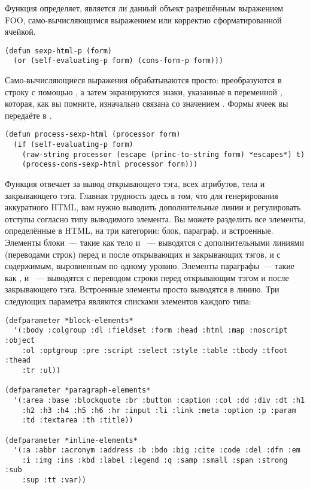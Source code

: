 Функция  определяет, является ли данный объект разрешённым выражением
FOO, само-вычисляющимся выражением или корректно сформатированной ячейкой.

\begin{lstlisting}
(defun sexp-html-p (form)
  (or (self-evaluating-p form) (cons-form-p form)))
\end{lstlisting}

Само-вычисляющиеся выражения обрабатываются просто: преобразуются в строку с помощью
, а затем экранируются знаки, указанные в переменной
, которая, как вы помните, изначально связана со значением
. Формы ячеек вы передаёте в .

\begin{lstlisting}
(defun process-sexp-html (processor form)
  (if (self-evaluating-p form)
    (raw-string processor (escape (princ-to-string form) *escapes*) t)
    (process-cons-sexp-html processor form)))
\end{lstlisting}

Функция  отвечает за вывод открывающего тэга, всех атрибутов,
тела и закрывающего тэга. Главная трудность здесь в том, что для генерирования аккуратного
HTML, вам нужно выводить дополнительные линии и регулировать отступы согласно типу
выводимого элемента. Вы можете разделить все элементы, определённые в HTML, на три
категории: блок, параграф, и встроенные. Элементы блоки~--- такие как тело и ~---
выводятся с дополнительными линиями (переводами строк) перед и после открывающих и
закрывающих тэгов, и с содержимым, выровненным по одному уровню. Элементы параграфы~---
такие как ,  и ~--- выводятся с переводом строки перед
открывающим тэгом и после закрывающего тэга. Встроенные элементы просто выводятся в
линию. Три следующих параметра являются списками элементов каждого типа:

\begin{lstlisting}
(defparameter *block-elements*
  '(:body :colgroup :dl :fieldset :form :head :html :map :noscript :object
    :ol :optgroup :pre :script :select :style :table :tbody :tfoot :thead
    :tr :ul))

(defparameter *paragraph-elements*
  '(:area :base :blockquote :br :button :caption :col :dd :div :dt :h1
    :h2 :h3 :h4 :h5 :h6 :hr :input :li :link :meta :option :p :param
    :td :textarea :th :title))

(defparameter *inline-elements*
  '(:a :abbr :acronym :address :b :bdo :big :cite :code :del :dfn :em
    :i :img :ins :kbd :label :legend :q :samp :small :span :strong :sub
    :sup :tt :var))
\end{lstlisting}

